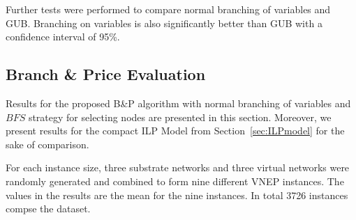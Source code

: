 \documentclass[conference]{IEEEtran}
\begin{document}
\begin{comment}
\begin{table*}[h]
\begin{center}
  \caption{Node Selection Results}\label{tab:wil}
\begin{tabular} {l l | r r | r r | r r | r r}
                &               &  \multicolumn{2}{c|}{DFS}  & \multicolumn{2}{c|}{BFS}   & \multicolumn{2}{c|}{BPJ} &               &                \\
  set           & size          &  optimal    & time        & optimal   & time          & \#opt       & time(s) 
 \hline 
 Random-Sparse  & 108            & 76         & 1086.198    & 85        & 851.900       & 83            & 863.664   & < $10^{-3}$         & 0.991         \\
 Random-Dense   & 108            & 78         & 961.499     & 88        & 792.101       & 87            & 691.442   & < $10^{-3}$         & 0.994         \\ 
 Hierarchical   & 108            & 62         & 1503.617    & 64        & 1375.611      & 59            & 1542.288  & < $10^{-3}$         & 0.035         \\
 Transit-stub   & 88             & 59         & 1393.760    & 66        & 1138.916      & 62            & 1294.336  & < $10^{-3}$         & 0.003         \\
\end{tabular}
\end{center}
\end{table*}
\end{comment}

Further tests were performed to compare normal branching of variables and GUB. 
Branching on variables is also significantly better than GUB with a confidence interval of 95\%.

\subsection{Branch \& Price Evaluation}
\label{sec:bptest}

  Results for the proposed B\&P algorithm with normal branching of variables and $BFS$ strategy for selecting nodes are presented in this section.
Moreover, we present results for the compact ILP Model from Section~\ref{sec:ILPmodel} for the sake of comparison.

For each instance size, three substrate networks and three virtual networks were randomly generated and combined to form nine different VNEP instances. The values in the results are the mean for the nine instances. In total 3726 instances compse the dataset.
\end{document}
